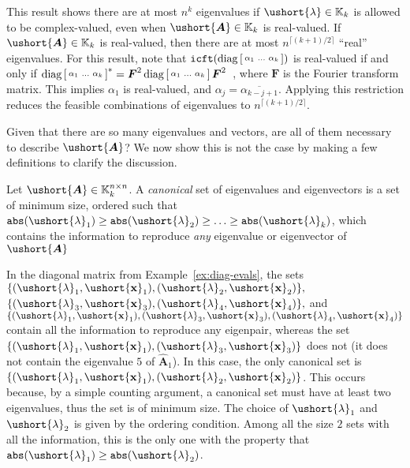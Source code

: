 \documentclass[1p,authoryear,letterpaper]{elsarticle}
\renewcommand{\cite}{\citep}
\DeclareMathOperator{\tabs}{\texttt{abs}}
\providecommand{\KK}{\mathbb{K}}
\newcommand{\conj}[1]{\overline{#1}}
\providecommand{\sbmat}[1]{\left[\begin{smallmatrix} #1 \end{smallmatrix}\right]}
\providecommand{\mat}{\boldsymbol}
\renewcommand{\vec}{\mathbf}
\providecommand{\mF}{\ensuremath{\mat{F}}}
\providecommand{\mhat}[1]{\ensuremath{\mat{\hat{#1}}}}
\providecommand{\mAhat}{\mhat{A}}
\newcommand{\fftm}{\mF}
\DeclareMathOperator{\ifft}{\texttt{icft}}
\newcommand{\ceilof}[1]{\lceil #1 \rceil}
\newcommand{\cel}[1]{\ushort{#1}}
\newcommand{\celm}[1]{\cel{\mat{#1}}}
\newcommand{\celv}[1]{\cel{\vec{#1}}}
\newcommand{\clambda}{\ensuremath{\cel{\lambda}}}
\newcommand{\cvx}{\ensuremath{\celv{x}}}
\providecommand{\cmA}{\ensuremath{\celm{A}}}
\begin{document}
This result shows
there are at most $n^k$ eigenvalues if $\clambda \in \KK_k$
is allowed to be complex-valued, even when $\cmA \in \KK_k$
is real-valued.  If $\cmA \in \KK_k$ is real-valued,
then there are at most $n^{\ceilof{(k+1)/2}}$ ``real''
eigenvalues.  For this result,
note that $\ifft(\diag\sbmat{\alpha_1 & \ldots & \alpha_k})$ is real-valued
if and only if $\diag\sbmat{\alpha_1 & \ldots & \alpha_k}^* =
\fftm^2 \diag\sbmat{\alpha_1 & \ldots & \alpha_k}\fftm^2$~\cite{davis1979-circulant},
where $\fftm$ is the Fourier transform matrix.   This
implies $\alpha_1$ is real-valued, and
$\alpha_j = \conj{\alpha_{k-j+1}}$.  Applying this restriction
reduces the feasible combinations
of eigenvalues to $n^{\ceilof{(k+1)/2}}$.


Given that there are so many eigenvalues and vectors, are all
of them necessary to describe $\cmA$?  We now show this is
not the case by making a few definitions to clarify
the discussion.
\begin{definition}
 Let $\cmA \in \KK_k^{n \times n}$.
  A  \emph{canonical} set
 of eigenvalues and eigenvectors is a set of minimum
 size, ordered such that
 $\tabs(\clambda_1) \ge \tabs(\clambda_2) \ge \ldots \ge \tabs(\clambda_k)$,
  which contains the information to
  reproduce \emph{any} eigenvalue or eigenvector of $\cmA$
\end{definition}
In the diagonal matrix from Example~\ref{ex:diag-evals},
the sets $\{ (\clambda_1, \cvx_1), (\clambda_2, \cvx_2) \},$
 $\{ (\clambda_3, \cvx_3), (\clambda_4, \cvx_4) \},$ and
$\{ (\clambda_1, \cvx_1), (\clambda_3, \cvx_3), (\clambda_4, \cvx_4) \}$
contain all the information to reproduce any eigenpair, whereas
the set $\{ (\clambda_1, \cvx_1), (\clambda_3, \cvx_3) \}$
does not (it does not contain the eigenvalue $5$ of $\mAhat_1$).
In this case,
the only canonical set is $\{ (\clambda_1, \cvx_1), (\clambda_2, \cvx_2) \}$.
This occurs because, by a simple counting argument, a canonical
set must have at least two eigenvalues, thus the set is of minimum size.
The choice of $\clambda_1$ and $\clambda_2$ is given by the ordering
condition.  Among all the size $2$ sets with all the information,
this is the only one with the property that $\tabs(\clambda_1) \ge \tabs(\clambda_2)$.
\end{document}
